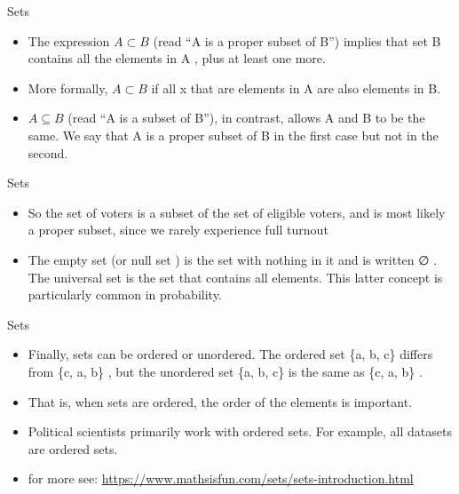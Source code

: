 \documentclass[
  ignorenonframetext,
]{beamer}
\begin{document}
\begin{frame}{Sets}
\protect\hypertarget{sets-6}{}

\begin{itemize}
\item
  The expression \(A \subset B\) (read ``A is a proper subset of B'')
  implies that set B contains all the elements in A , plus at least one
  more.
\item
  More formally, \(A \subset B\) if all x that are elements in A are
  also elements in B.
\item
  \(A \subseteq B\) (read ``A is a subset of B''), in contrast, allows A
  and B to be the same. We say that A is a proper subset of B in the
  first case but not in the second.
\end{itemize}

\end{frame}

\begin{frame}{Sets}
\protect\hypertarget{sets-7}{}

\begin{itemize}
\item
  So the set of voters is a subset of the set of eligible voters, and is
  most likely a proper subset, since we rarely experience full turnout
\item
  The empty set (or null set ) is the set with nothing in it and is
  written ∅ . The universal set is the set that contains all elements.
  This latter concept is particularly common in probability.
\end{itemize}

\end{frame}

\begin{frame}{Sets}
\protect\hypertarget{sets-8}{}

\begin{itemize}
\item
  Finally, sets can be ordered or unordered. The ordered set \{a, b, c\}
  differs from \{c, a, b\} , but the unordered set \{a, b, c\} is the
  same as \{c, a, b\} .
\item
  That is, when sets are ordered, the order of the elements is
  important.
\item
  Political scientists primarily work with ordered sets. For example,
  all datasets are ordered sets.
\item
  for more see:
  \url{https://www.mathsisfun.com/sets/sets-introduction.html}
\end{itemize}

\end{frame}
\end{document}
